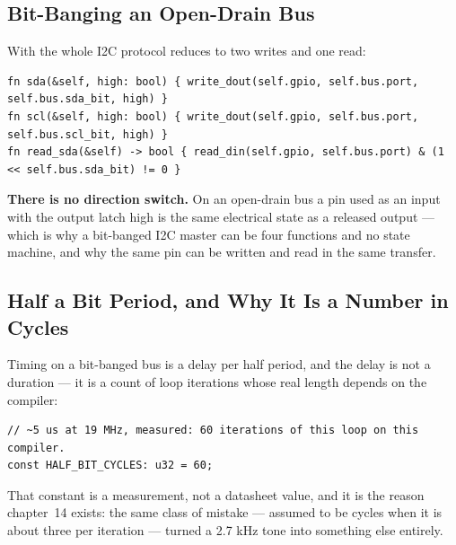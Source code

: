 \subsection{Bit-Banging an Open-Drain Bus}

With  the whole I2C protocol reduces to two writes and one read:

\begin{verbatim}
fn sda(&self, high: bool) { write_dout(self.gpio, self.bus.port, self.bus.sda_bit, high) }
fn scl(&self, high: bool) { write_dout(self.gpio, self.bus.port, self.bus.scl_bit, high) }
fn read_sda(&self) -> bool { read_din(self.gpio, self.bus.port) & (1 << self.bus.sda_bit) != 0 }
\end{verbatim}

\textbf{There is no direction switch.} On an open-drain bus a pin used as an input with the output
latch high is the same electrical state as a released output — which is why a bit-banged I2C master
can be four functions and no state machine, and why the same pin can be written and read in the same
transfer.

\subsection{Half a Bit Period, and Why It Is a Number in Cycles}

Timing on a bit-banged bus is a delay per half period, and the delay is not a duration — it is a
count of loop iterations whose real length depends on the compiler:

\begin{verbatim}
// ~5 us at 19 MHz, measured: 60 iterations of this loop on this compiler.
const HALF_BIT_CYCLES: u32 = 60;
\end{verbatim}

That constant is a measurement, not a datasheet value, and it is the reason chapter~14 exists: the
same class of mistake —  assumed to be  cycles when it is
about three per iteration — turned a 2.7 kHz tone into something else entirely.
